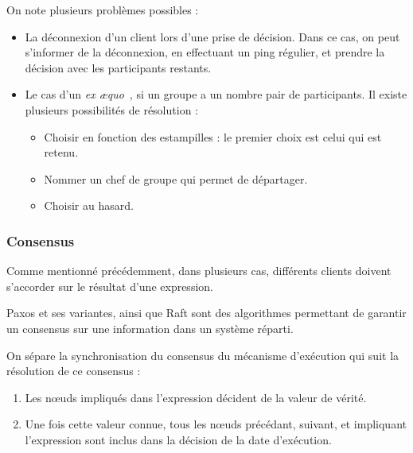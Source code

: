 \documentclass[10pt]{article}
\newcommand\trigger{point d'interaction\xspace}
\begin{document}
On note plusieurs problèmes possibles : 
\begin{itemize}
    \item La déconnexion d'un client lors d'une prise de décision. 
    Dans ce cas, on peut s'informer de la déconnexion, en effectuant un ping régulier, et prendre la décision avec les participants restants. 
    \item Le cas d'un \textit{ex æquo}~, si un groupe a un nombre pair de participants.
    Il existe plusieurs possibilités de résolution : 
    \begin{itemize}
        \item Choisir en fonction des estampilles : le premier choix est celui qui est retenu.
        \item Nommer un chef de groupe qui permet de départager.
        \item Choisir au hasard.
    \end{itemize}
\end{itemize}

\subsubsection{Consensus}\label{section.consensus}
Comme mentionné précédemment, dans plusieurs cas, différents clients doivent s'accorder sur le résultat d'une expression.

Paxos et ses variantes\cite{lamport1998part}, ainsi que Raft\cite{ongaro2014search} sont des algorithmes permettant de garantir un consensus sur une information dans un système réparti. 

On sépare la synchronisation du consensus du mécanisme d'exécution qui suit la résolution de ce consensus : 
\begin{enumerate}
    \item Les nœuds impliqués dans l'expression décident de la valeur de vérité.
    \item Une fois cette valeur connue, tous les nœuds précédant, suivant, et impliquant l'expression sont inclus dans la décision de la date d'exécution.
\end{enumerate}


\end{document}
